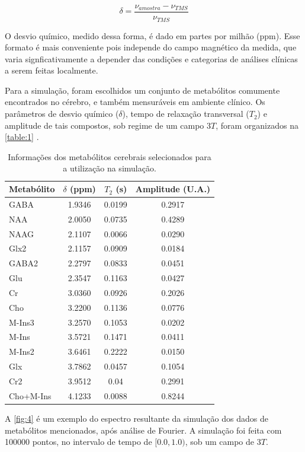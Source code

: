 \documentclass[12pt]{article}
\begin{document}
\begin{equation} \label{eq:4}
    \delta = \frac{\nu _{amostra} - \nu _{TMS}}{\nu _{TMS}}
\end{equation}

O desvio químico, medido dessa forma, é dado em partes por milhão (ppm). Esse formato é mais conveniente pois independe do campo magnético da medida, que varia signficativamente a depender das 
condições e categorias de análises clínicas a serem feitas localmente.

Para a simulação, foram escolhidos um conjunto de metabólitos comumente encontrados no cérebro, e também mensuráveis em ambiente clínico. Os parâmetros de desvio químico ($\delta$), tempo de relaxação 
transversal ($T_2$) e amplitude de tais compostos, sob regime de um campo $3T$, foram organizados na \autoref{table:1} \cite{Silva2020-io}.

\begin{table}[H] 
    \centering
    \begin{tabular}{|l|c|c|c|}
    \hline
    Metabólito & $\delta$ (ppm) & $T_2$ (s) & Amplitude (U.A.) \\
    \hline
    GABA & 1.9346 & 0.0199 & 0.2917 \\
    NAA & 2.0050 & 0.0735 & 0.4289 \\
    NAAG & 2.1107 & 0.0066 & 0.0290 \\
    Glx2 & 2.1157 & 0.0909 & 0.0184 \\
    GABA2 & 2.2797 & 0.0833 & 0.0451 \\
    Glu & 2.3547 & 0.1163 & 0.0427 \\
    Cr & 3.0360 & 0.0926 & 0.2026 \\
    Cho & 3.2200 & 0.1136 & 0.0776 \\
    M-Ins3 & 3.2570 & 0.1053 & 0.0202 \\
    M-Ins & 3.5721 & 0.1471 & 0.0411 \\
    M-Ins2 & 3.6461 & 0.2222 & 0.0150 \\
    Glx & 3.7862 & 0.0457 & 0.1054 \\
    Cr2 & 3.9512 & 0.04 & 0.2991 \\
    Cho+M-Ins & 4.1233 & 0.0088 & 0.8244 \\
    \hline
    \end{tabular}
    \caption{Informações dos metabólitos cerebrais selecionados para a utilização	na simulação.}
    \label{table:1}
\end{table}

A \autoref{fig:4} é um exemplo do espectro resultante da simulação dos dados de metabólitos mencionados, após análise de Fourier. A simulação foi feita com 100000 pontos,
no intervalo de tempo de $[0.0, 1.0)$, sob um campo de $3T$. 
\end{document}
